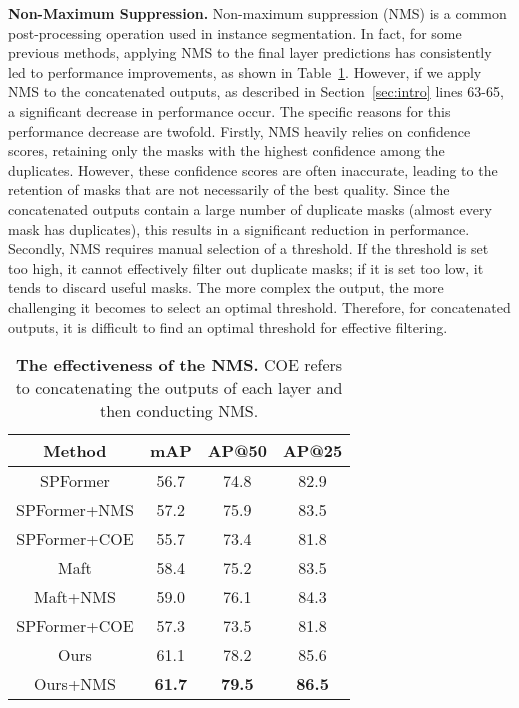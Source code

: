 \textbf{Non-Maximum Suppression.} Non-maximum suppression (NMS) is a common post-processing operation used in instance segmentation. In fact, for some previous methods, applying NMS to the final layer predictions has consistently led to performance improvements, as shown in Table~\ref{table:nms}. However, if we apply NMS to the concatenated outputs, as described in Section~\ref{sec:intro} lines 63-65, a significant decrease in performance occur.
The specific reasons for this performance decrease are twofold. Firstly, NMS heavily relies on confidence scores, retaining only the masks with the highest confidence among the duplicates. However, these confidence scores are often inaccurate, leading to the retention of masks that are not necessarily of the best quality. Since the concatenated outputs contain a large number of duplicate masks (almost every mask has duplicates), this results in a significant reduction in performance. Secondly, NMS requires manual selection of a threshold. If the threshold is set too high, it cannot effectively filter out duplicate masks; if it is set too low, it tends to discard useful masks. The more complex the output, the more challenging it becomes to select an optimal threshold. Therefore, for concatenated outputs, it is difficult to find an optimal threshold for effective filtering.
\begin{table}[!ht]
  \begin{center}
    \footnotesize
    \setlength\tabcolsep{5pt}
    \centering
    \caption{\textbf{The effectiveness of the NMS.} COE refers to concatenating the outputs of each layer and then conducting NMS.}
    \label{table:nms}
    \begin{tabular}{c|ccc}
      \toprule
     Method&mAP&AP@50&AP@25\\
    \midrule
      SPFormer &56.7  &74.8 &82.9 \\
      SPFormer+NMS &57.2 &75.9& 83.5\\
      SPFormer+COE &55.7 & 73.4  &81.8\\
      \midrule
      Maft &58.4 &75.2 &83.5 \\
      Maft+NMS&59.0& 76.1 &84.3\\
      SPFormer+COE &57.3& 73.5& 81.8\\
      \midrule
      Ours &61.1& 78.2& 85.6\\
      Ours+NMS&\textbf{61.7} &\textbf{79.5}& \textbf{86.5}\\
      \bottomrule 
    \end{tabular}
  \end{center}
\end{table}

